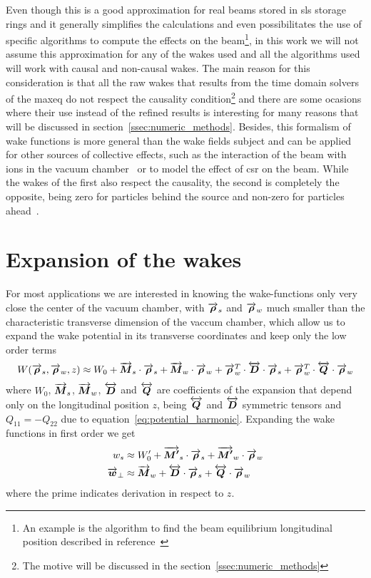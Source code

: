     Even though this is a good approximation for real beams stored in \gls{sls} storage rings and it generally simplifies the calculations and even possibilitates the use of specific algorithms to compute the effects on the beam\footnote{An example is the algorithm to find the beam equilibrium longitudinal position described in reference~\cite{bane}}, in this work we will not assume this approximation for any of the wakes used and all the algorithms used will work with causal and non-causal wakes. The main reason for this consideration is that all the raw wakes that results from the time domain solvers of the \gls{maxeq} do not respect the causality condition\footnote{The motive will be discussed in the section~\ref{ssec:numeric_methods}} and there are some ocasions where their use instead of the refined results is interesting for many reasons that will be discussed in section~\ref{ssec:numeric_methods}. Besides, this formalism of wake functions is more general than the wake fields subject and can be applied for other sources of collective effects, such as the interaction of the beam with ions in the vacuum chamber~\cite{zimerman} or to model the effect of \gls{csr} on the beam. While the wakes of the first also respect the causality, the second is completely the opposite, being zero for particles behind the source and non-zero for particles ahead~\cite{csrpaper}.

\section{Expansion of the wakes}

    For most applications we are interested in knowing the wake-functions only very close the center of the vacuum chamber, with $\overrightarrow{\boldsymbol{\rho}}_s$ and $\overrightarrow{\boldsymbol{\rho}}_w$ much smaller than the characteristic transverse dimension of the vaccum chamber, which allow us to expand the wake potential in its transverse coordinates and keep only the low order terms
    \begin{align}\label{eq:wake_potential_expansion}
      	W(\overrightarrow{\boldsymbol{\rho}}_s, \overrightarrow{\boldsymbol{\rho}}_w, z) \approx W_0 +
	  	\overrightarrow{\boldsymbol{M}}_s\cdot\overrightarrow{\boldsymbol{\rho}}_s + \overrightarrow{\boldsymbol{M}}_w\cdot\overrightarrow{\boldsymbol{\rho}}_w +
	  	\overrightarrow{\boldsymbol{\rho}}_w^T\cdot\overleftrightarrow{\boldsymbol{D}}\cdot\overrightarrow{\boldsymbol{\rho}}_s +
	  	\overrightarrow{\boldsymbol{\rho}}_w^T\cdot\overleftrightarrow{\boldsymbol{Q}}\cdot\overrightarrow{\boldsymbol{\rho}}_w
    \end{align}
    where $W_0$, $\overrightarrow{\boldsymbol{M}}_s$, $\overrightarrow{\boldsymbol{M}}_w$, $\overleftrightarrow{\boldsymbol{D}}$ and $\overleftrightarrow{\boldsymbol{Q}}$ are coefficients of the expansion that depend only on the longitudinal position $z$, being $\overleftrightarrow{\boldsymbol{Q}}$ and $\overleftrightarrow{\boldsymbol{D}}$ symmetric tensors and $Q_{11}=-Q_{22}$ due to equation~\eqref{eq:potential_harmonic}. Expanding the wake functions in first order we get
    \begin{align}\label{eq:wake_functions_expansion}
      	w_s &\approx W'_0 + \overrightarrow{\boldsymbol{M'}}_s\cdot\overrightarrow{\boldsymbol{\rho}}_s + \overrightarrow{\boldsymbol{M'}}_w\cdot\overrightarrow{\boldsymbol{\rho}}_w \\
	  	\overrightarrow{\boldsymbol{w}}_\perp &\approx \overrightarrow{\boldsymbol{M}}_w + \overleftrightarrow{\boldsymbol{D}}\cdot\overrightarrow{\boldsymbol{\rho}}_s + \overleftrightarrow{\boldsymbol{Q}}\cdot\overrightarrow{\boldsymbol{\rho}}_w
    \end{align}
    where the prime indicates derivation in respect to $z$.

